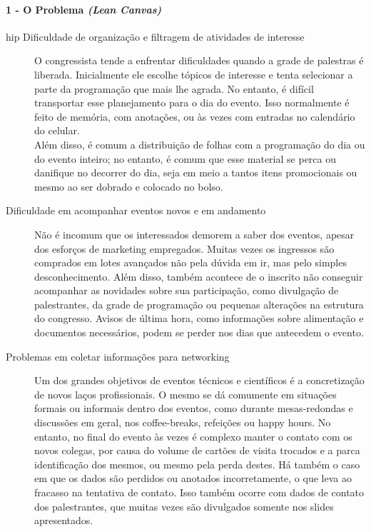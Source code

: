 \documentclass[12pt,a4paper,twoside,hyphens,english,brazil]{abntex2}
\newcommand{\hip}{{\color{BlueViolet}\framebox[1.1\width]{HIP}}}
\begin{document}
\paragraph*{1 - O Problema \emph{(Lean Canvas)}}
\begin{description}
\item[hip{} Dificuldade de organização e filtragem de atividades de interesse] 
O congressista tende a enfrentar dificuldades quando a grade de palestras é liberada. Inicialmente ele escolhe tópicos de interesse e tenta selecionar a parte da programação que mais lhe agrada. No entanto, é difícil transportar esse planejamento para o dia do evento. Isso normalmente é feito de memória, com anotações, ou às vezes com entradas no calendário do celular.\\
Além disso, é comum a distribuição de folhas com a programação do dia ou do evento inteiro; no entanto, é comum que esse material se perca ou danifique no decorrer do dia, seja em meio a tantos itens promocionais ou mesmo ao ser dobrado e colocado no bolso.

\item[\hip{} Dificuldade em acompanhar eventos novos e em andamento]
Não é incomum que os interessados demorem a saber dos eventos, apesar dos esforços de marketing empregados. Muitas vezes os ingressos são comprados em lotes avançados não pela dúvida em ir, mas pelo simples desconhecimento. Além disso, também acontece de o inscrito não conseguir acompanhar as novidades sobre sua participação, como divulgação de palestrantes, da grade de programação ou pequenas alterações na estrutura do congresso. Avisos de última hora, como informações sobre alimentação e documentos necessários, podem se perder nos dias que antecedem o evento.

\item[\hip{} Problemas em coletar informações para networking]
Um dos grandes objetivos de eventos técnicos e científicos é a concretização de novos laços profissionais. O mesmo se dá comumente em situações formais ou informais dentro dos eventos, como durante mesas-redondas e discussões em geral, nos coffee-breaks, refeições ou happy hours. No entanto, no final do evento às vezes é complexo manter o contato com os novos colegas, por causa do volume de cartões de visita trocados e a parca identificação dos mesmos, ou mesmo pela perda destes. Há também o caso em que os dados são perdidos ou anotados incorretamente, o que leva ao fracasso na tentativa de contato. Isso também ocorre com dados de contato dos palestrantes, que muitas vezes são divulgados somente nos slides apresentados.


\end{description}
\end{document}
